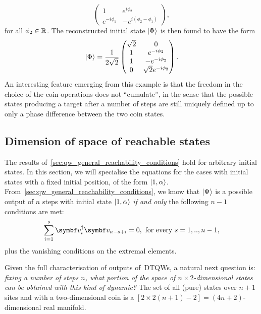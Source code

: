 \begin{example}[label=ex:qw_conditions_few_steps]
\begin{equation}
\begin{pmatrix}
            1 & e^{i\phi_2} \\
            e^{-i\phi_1} & -e^{i(\phi_2-\phi_1)}
        \end{pmatrix},
    \end{equation}
    for all $\phi_2\in\mathbb{R}$. The reconstructed initial state $\ket\Phi$ is then found to have the form
    \begin{equation}
        \ket\Phi = \frac{1}{2\sqrt2}
        \begin{pmatrix}
            \sqrt2 & 0 \\
            1 & e^{-i\phi_2} \\
            1 & -e^{-i\phi_2} \\
            0 & \sqrt2 e^{-i\phi_2}
        \end{pmatrix}.
    \end{equation}
    An interesting feature emerging from this example is that the freedom in the choice of the coin operations does not ``cumulate'', in the sense that the possible states producing a target after a number of steps are still uniquely defined up to only a phase difference between the two coin states.
\end{example}

\subsection{Dimension of space of reachable states}
\label{sec:qw_reachable_space}

The results of~\cref{sec:qw_general_reachability_conditions} hold for arbitrary initial states. In this section, we will specialise the equations for the cases with initial states with a fixed initial position, of the form $\ket{1,\alpha}$.
From~\cref{sec:qw_general_reachability_conditions}, we know that $\ket{\Psi}$ is a possible output of $n$ steps with initial state $\ket{1,\alpha}$ \textit{if and only} the following $n-1$ conditions are met:
\begin{equation}
	\sum_{i=1}^s \bs v_i^{\dagger} \bs v_{n-s+i} = 0,
	\text{ for every } s=1,..,n-1,
	\label{eq:qw_general_reachability_conditions}
\end{equation}
plus the vanishing conditions on the extremal elements.

Given the full characterisation of outputs of~\acp{DTQW}, a natural next question is: \textit{fixing a number of steps $n$, what portion of the space of $n\times 2$-dimensional states can be obtained with this kind of dynamic?}
The set of all (pure) states over $n+1$ sites and with a two-dimensional coin is a $[2\times2(n+1)-2]=(4n+2)$-dimensional real manifold.

